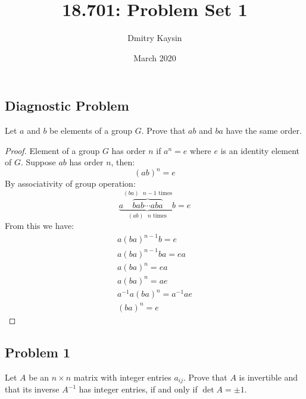 \documentclass{article}
\title{18.701: Problem Set 1}
\author{Dmitry Kaysin}
\date{March 2020}
\begin{document}
\maketitle 


\subsection*{Diagnostic Problem}

\begin{tcolorbox}
Let $a$ and $b$ be elements of a group $G$.
Prove that $ab$ and $ba$ have the same order.
\end{tcolorbox}

\begin{proof}

Element of a group $G$ has order $n$ if $a^n = e$ where $e$ is an identity element of $G$.
Suppose $ab$ has order $n$, then:
\[ (ab)^n = e \]
By associativity of group operation:
\[ \underbrace{a\overbrace{bab \cdots aba}^\text{$(ba)$ $n-1$ times} b}_\text{$(ab)$ $n$ times} = e \]
From this we have:
\begin{gather*}
    a(ba)^{n-1}b = e \\
    a(ba)^{n-1}ba = ea \\
    a(ba)^{n} = ea \\
    a(ba)^{n} = ae \\
    a^{-1}a(ba)^{n} = a^{-1}ae \\
    (ba)^{n} = e
\end{gather*}

\end{proof}


\subsection*{Problem 1}

\begin{tcolorbox}
Let $A$ be an $n \times n$ matrix with integer entries $a_{ij}$.
Prove that $A$ is invertible and that its inverse $A^{-1}$ has integer entries, if and only if $\det A = \pm 1$.
\end{tcolorbox}
\end{document}
